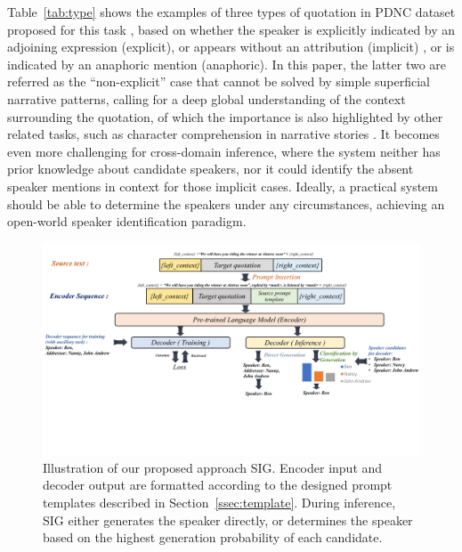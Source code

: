 \documentclass[letterpaper]{article} %
\begin{document}
Table~\ref{tab:type} shows the examples of three types of quotation in PDNC dataset proposed for this task \cite{DBLP:conf/lrec/VishnubhotlaHH22}, based on whether the speaker is explicitly indicated by an adjoining expression (explicit), or appears without an attribution (implicit) , or is indicated by an anaphoric mention (anaphoric). In this paper, the latter two are referred as the ``non-explicit'' case that cannot be solved by simple superficial narrative patterns, calling for a deep global understanding of the context surrounding the quotation, of which the importance is also highlighted by other related tasks, such as character comprehension in narrative stories \cite{yu2022fewshot,sang-etal-2022-tvshowguess}.
It becomes even more challenging for cross-domain inference, where the system neither has prior knowledge about candidate speakers, nor it could identify the absent speaker mentions in context for those implicit cases. Ideally, a practical system should be able to determine the speakers under any circumstances, achieving an open-world speaker identification paradigm.

\begin{figure}[t]
\centering
\includegraphics[width=\textwidth]{approach.pdf}
\caption{Illustration of our proposed approach SIG. Encoder input and decoder output are formatted according to the designed prompt templates described in Section~\ref{ssec:template}. During inference, SIG either generates the speaker directly, or determines the speaker based on the highest generation probability of each candidate.}
\label{figure: framework}
\end{figure}
\end{document}
